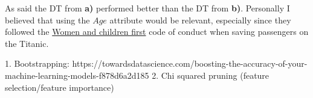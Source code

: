 \documentclass[11pt, english]{../Template/NTNUoving}
\begin{document}
\begin{oppgave}
\begin{punkt}
    \end{punkt}

    \begin{punkt}
        As said the DT from \textbf{a)} performed better than the DT from \textbf{b)}. Personally I believed that
        using the $Age$ attribute would be relevant, especially since they followed the \href{https://en.wikipedia.org/wiki/Women_and_children_first}{Women and children first}
        code of conduct when saving passengers on the Titanic.

        1. Bootstrapping: https://towardsdatascience.com/boosting-the-accuracy-of-your-machine-learning-models-f878d6a2d185
        2. Chi squared pruning (feature selection/feature importance)
    \end{punkt}
\end{oppgave}
\end{document}
